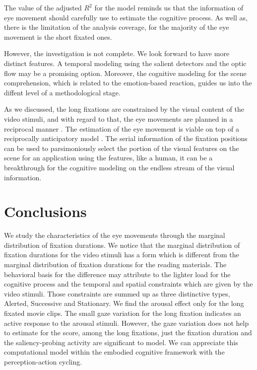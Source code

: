 \documentclass[oneside,master]{snueethesis}
\begin{document}
The value of the adjusted $R^{2}$ for the model reminds us that the information of eye movement should carefully use to estimate the cognitive process. As well as, there is the limitation of the analysis coverage, for the majority of the eye movement is the short fixated ones. 

However, the investigation is not complete. We look forward to have more distinct features. A temporal modeling using the salient detectors \cite{marr1980,canny1986} and the optic flow \cite{koenderink1986} may be a promising option. Moreover, the cognitive modeling for the scene comprehension, which is related to the emotion-based reaction, guides us into the diffent level of a methodological stage. 

As we discussed, the long fixations are constrained by the visual content of the video stimuli, and with regard to that, the eye movements are planned in a reciprocal manner \cite{zhang2013}. The estimation of the eye movement is viable on top of a reciprocally anticipatory model \cite{robert1985anticipatory}. The serial information of the fixation positions can be used to parsimoniously select the portion of the visual features on the scene for an application using the features, like a human, it can be a breakthrough for the cognitive modeling on the endless stream of the visual information.


\chapter{Conclusions}

We study the characteristics of the eye movements through the marginal distribution of fixation durations. We notice that the marginal distribution of fixation durations for the video stimuli has a form which is different from the marginal distribution of fixation durations for the reading materials. The behavioral basis for the difference may attribute to the lighter load for the cognitive process and the temporal and spatial constraints which are given by the video stimuli. Those constraints are summed up as three distinctive types, Alerted, Successive and Stationary. We find the arousal effect only for the long fixated movie clips. The small gaze variation for the long fixation indicates an active response to the arousal stimuli. However, the gaze variation does not help to estimate for the score, among the long fixations, just the fixation duration and the saliency-probing activity are significant to model. We can appreciate this computational model within the embodied cognitive framework with the perception-action cycling.
\end{document}
